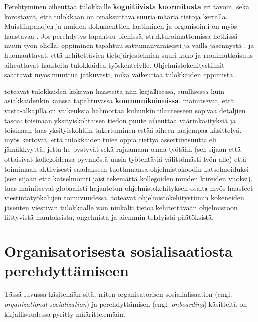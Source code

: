 \documentclass[utf8]{gradu3}
\begin{document}
Perehtyminen aiheuttaa tulokkaille \textbf{kognitiivista kuormitusta} eri tavoin. \textcite{dagenais-ym-2010} sekä \textcite{begel-simon-2008} korostavat, että tulokkaan on omaksuttava suuria määriä tietoja kerralla. Muistiinpanojen ja muiden dokumenttien laatiminen ja organisointi on myös haastavaa \parencite{radermacher-ym-2015}. Jos perehdytys tapahtuu pienissä, strukturoimattomissa hetkissä muun työn ohella, oppiminen tapahtuu sattumanvaraisesti ja vailla jäsennystä \parencite{begel-simon-2008}. \textcite{craig-ym-2018} ja \textcite{britto-ym-2019} huomauttavat, että kehitettävien tietojärjestelmien suuri koko ja monimutkaisuus aiheuttavat haasteita tulokkaiden työskentelylle. Ohjelmistokehitystiimit saattavat myös muuttua jatkuvasti, mikä vaikeuttaa tulokkaiden oppimista \parencite{britto-ym-2019}.

\textcite{radermacher-ym-2015} toteavat tulokkaiden kokevan haasteita niin kirjallisessa, suullisessa kuin asiakkaidenkin kanssa tapahtuvassa \textbf{kommunikoinnissa}. \textcite{begel-simon-2008} mainitsevat, että vasta-alkajilla on vaikeuksia hahmottaa kuhunkin tilanteeseen sopivaa detaljien tasoa: toisinaan yksityiskohtaisen tiedon puute aiheuttaa väärinkäsityksiä ja toisinaan taas yksityiskohtiin takertuminen estää aiheen laajempaa käsittelyä. \textcite{begel-simon-2008} myös kertovat, että tulokkaiden tulee oppia tiettyä assertiivisuutta eli jämäkkyyttä, jotta he pystyvät sekä rajaamaan omaa työtään (sen sijaan että ottaisivat kollegoidensa pyynnöstä uusia työtehtäviä välittömästi työn alle) että toimimaan aktiivisesti saadakseen tuottamansa ohjelmistokoodin katselmoiduksi (sen sijaan että katselmointi jäisi tekemättä kollegoiden muiden kiireiden vuoksi). \textcite{moe-ym-2020} taas mainitsevat globaalisti hajautetun ohjelmistokehityksen osalta myös haasteet viestintätyökalujen toimivuudessa. \textcite{matturro-ym-2017} toteavat ohjelmistokehitystiimin kokeneiden jäsenten viestivän tulokkaalle vain niukalti tietoa kehitettävään ohjelmistoon liittyvistä muutoksista, ongelmista ja aiemmin tehdyistä päätöksistä.



\section{Organisatorisesta sosialisaatiosta perehdyttämiseen}

Tässä luvussa käsitellään sitä, miten organisatorisen sosialialisaation (engl. \textit{organizational socialization}) ja perehdyttämisen (engl. \textit{onboarding}) käsitteitä on kirjallisuudessa pyritty määrittelemään. 
\end{document}
